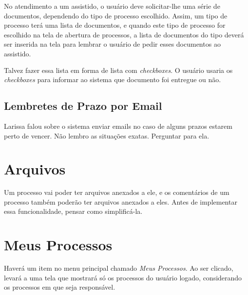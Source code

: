 \documentclass[a4paper]{article}
\begin{document}
No atendimento a um assistido, o usuário deve solicitar-lhe uma série
de documentos, dependendo do tipo de processo escolhido. Assim, um
tipo de processo terá uma lista de documentos, e quando este tipo de
processo for escolhido na tela de abertura de processos, a lista de
documentos do tipo deverá ser inserida na tela para lembrar o usuário
de pedir esses documentos ao assistido.

Talvez fazer essa lista em forma de lista com \textit{checkboxes}. O
usuário usaria os \textit{checkboxes} para informar ao sistema que
documento foi entregue ou não.

\subsection{Lembretes de Prazo por Email}
Larissa falou sobre o sistema enviar emails no caso de alguns prazos
estarem perto de vencer. Não lembro as situações exatas. Perguntar
para ela.

\section{Arquivos}
Um processo vai poder ter arquivos anexados a ele, e os comentários de
um processo também poderão ter arquivos anexados a eles. Antes de
implementar essa funcionalidade, pensar como simplificá-la.

\section{Meus Processos}
Haverá um item no menu principal chamado \textit{Meus Processos}. Ao ser
clicado, levará a uma tela que mostrará só os processos do usuário logado,
considerando os processos em que seja responsável.
\end{document}
